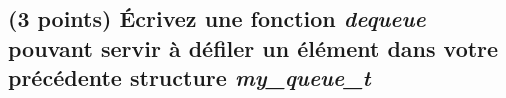 \documentclass[11pt,a4paper]{article}
\begin{document}
\bigskip

\begin{center}

\end{center}

\newpage

\subsection{(3 points) \'Ecrivez une fonction \og \textit{dequeue} \fg{} pouvant servir à défiler un élément dans votre précédente structure \og \textit{my\_queue\_t} \fg{} }

\bigskip

\begin{center}
\end{center}

\bigskip
\end{document}
